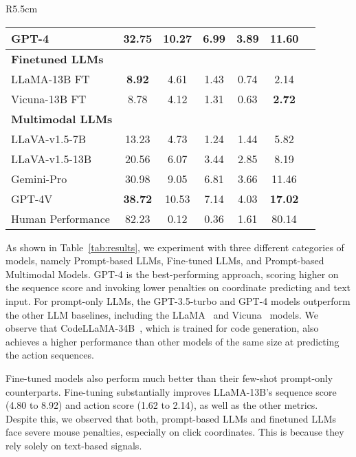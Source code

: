 \begin{wraptable}{R}{5.5cm}
{\begin{tabular}{@{}lcccccc@{}}
GPT-4  \cite{openai2023gpt4}               & \textbf{32.75} & 10.27 & 6.99 & 3.89 & \textbf{11.60} \\ \midrule
\textbf{\small Finetuned LLMs} \\
LLaMA-13B FT          & \textbf{8.92}  & 4.61  & 1.43 & 0.74 & 2.14  \\
Vicuna-13B FT         & 8.78  & 4.12  & 1.31 & 0.63 & \textbf{2.72}  \\ \midrule
\textbf{\small Multimodal LLMs} \\
LLaVA-v1.5-7B~\cite{liu2023llava}        & 13.23 & 4.73  & 1.24 & 1.44 & 5.82  \\
LLaVA-v1.5-13B~\cite{liu2023improvedllava}       & {20.56} & 6.07  & 3.44 & 2.85 & {8.19}\\ 
{Gemini-Pro}~\cite{team2023gemini} & 30.98 & 9.05 & 6.81 & 3.66 & 11.46\\
{GPT-4V}~\cite{liu2023improvedllava}       & \textbf{38.72} & 10.53  & 7.14 & 4.03 & \textbf{17.02}\\ 
 \midrule
Human Performance & 82.23 & 0.12 & 0.36 & 1.61 & 80.14\\
\bottomrule
\end{tabular}%
}

\label{tab:results}
\end{wraptable}

As shown in Table~\ref{tab:results}, we experiment with three different categories of models, namely Prompt-based LLMs, Fine-tuned LLMs, and Prompt-based Multimodal Models. 
GPT-4 is the best-performing approach, scoring higher on the sequence score and invoking lower penalties on coordinate predicting and text input. 
For prompt-only LLMs, the GPT-3.5-turbo and GPT-4 models outperform the other LLM baselines, including the LLaMA~\cite{touvron2023llama} and Vicuna~\cite{vicuna2023} models. We observe that CodeLLaMA-34B~\cite{rozière2023codellama}, which is trained for code generation, also achieves a higher performance than other models of the same size at predicting the action sequences. 

Fine-tuned models also perform much better than their few-shot prompt-only counterparts. Fine-tuning substantially improves LLaMA-13B's sequence score (4.80 to 8.92) and action score (1.62 to 2.14), as well as the other metrics. 
Despite this, we observed that both, prompt-based LLMs and finetuned LLMs face severe mouse penalties, especially on click coordinates. This is because they rely solely on text-based signals. 

